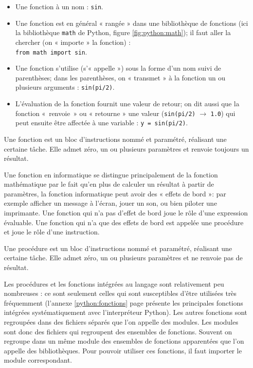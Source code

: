 \begin{itemize}
\item Une fonction à un nom : {\tt sin}.
\item Une fonction est en général « rangée » dans une bibliothèque de fonctions (ici la biblio\-thè\-que {\tt math}
	de {\sc Python}, figure \ref{fig:python:math}); 
	il faut aller la chercher (on « importe » la fonction) :\\ {\tt from math import sin}.
\item Une fonction s'utilise (s'« appelle ») sous la forme d'un nom suivi de parenthèses;
	dans les parenthèses, on « transmet » à la fonction un ou plusieurs arguments :
	{\tt sin(pi/2)}.
\item L'évaluation de la fonction fournit une valeur de retour; on dit aussi que la
	fonction «~renvoie~»  ou « retourne » une valeur 
	({\tt sin(pi/2)} $\rightarrow$ {\tt 1.0}) qui peut ensuite 
	être affectée à une variable : {\tt y = sin(pi/2)}.
\end{itemize}
     
\begin{defin}[fonction]
Une fonction est un bloc d'instructions nommé et paramétré,
réalisant une certaine tâche. Elle admet zéro, un ou plusieurs 
paramètres et renvoie toujours un résultat.
\end{defin}

Une fonction en informatique se distingue principalement de la 
fonction mathématique par le fait qu'en plus de calculer un résultat 
à partir de paramètres, la fonction informatique peut avoir des « effets de bord »: 
par exemple afficher un message à l'écran, jouer un son, 
ou bien piloter une imprimante.
Une fonction qui n'a pas d'effet de bord joue le rôle d'une expression
évaluable. Une fonction qui n'a que des effets de bord est appelée une procédure
et joue le rôle d'une instruction.

\begin{defin}[procédure]
Une procédure est un bloc d'instructions nommé et paramétré,
réalisant une certaine tâche. Elle admet zéro, un ou plusieurs 
paramètres et ne renvoie pas de résultat.
\end{defin}

Les procédures et les fonctions intégrées au langage sont 
relativement peu nombreuses : ce sont seulement celles qui sont susceptibles 
d'être utilisées très fréquemment (l'annexe \ref{python:fonctions} page 
\pageref{python:fonctions} présente les principales fonctions
intégrées systématiquement avec l'interpréteur {\sc Python}). 
Les autres fonctions sont regroupées dans des fichiers séparés que l'on appelle des modules.
Les modules sont donc des fichiers qui regroupent des ensembles de fonctions. 
Souvent on regroupe dans un même module des ensembles de fonctions 
apparentées que l'on appelle des bibliothèques.
Pour pouvoir utiliser ces fonctions, il faut importer le module correspondant.


